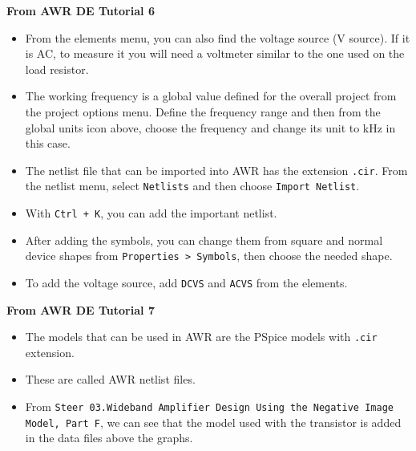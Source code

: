 \documentclass{article}
\begin{document}
\textbf{From AWR DE Tutorial 6}
\begin{itemize}
    \item From the elements menu, you can also find the voltage source (V source). If it is AC, to measure it you will need a voltmeter similar to the one used on the load resistor.
    \item The working frequency is a global value defined for the overall project from the project options menu. Define the frequency range and then from the global units icon above, choose the frequency and change its unit to kHz in this case.
    \item The netlist file that can be imported into AWR has the extension \texttt{.cir}. From the netlist menu, select \texttt{Netlists} and then choose \texttt{Import Netlist}.
    \item With \texttt{Ctrl + K}, you can add the important netlist.
    \item After adding the symbols, you can change them from square and normal device shapes from \texttt{Properties > Symbols}, then choose the needed shape.
    \item To add the voltage source, add \texttt{DCVS} and \texttt{ACVS} from the elements.
\end{itemize}

\textbf{From AWR DE Tutorial 7}
\begin{itemize}
    \item The models that can be used in AWR are the PSpice models with \texttt{.cir} extension.
    \item These are called AWR netlist files.
    \item From \texttt{Steer 03.Wideband Amplifier Design Using the Negative Image Model, Part F}, we can see that the model used with the transistor is added in the data files above the graphs.
\end{itemize}
\end{document}
